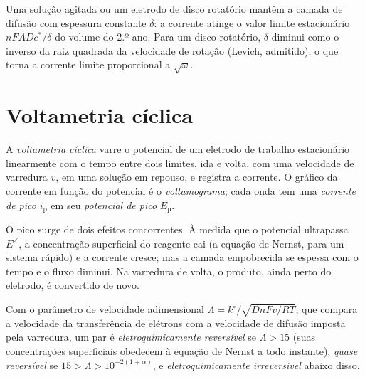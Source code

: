Uma solução agitada ou um eletrodo de disco rotatório mantêm a camada de difusão
com espessura constante $\delta$: a corrente atinge o valor limite estacionário $nFADc^*/\delta$
do volume do 2.º ano. Para um disco rotatório, $\delta$ diminui como o inverso da raiz
quadrada da velocidade de rotação (Levich, admitido), o que torna a corrente limite
proporcional a $\sqrt\omega$.

\section{Voltametria cíclica}

\begin{definition}\label{def:b3:electrode-kinetics:cv}
A \emph{voltametria cíclica} varre o potencial de um
eletrodo de trabalho estacionário linearmente com o tempo entre dois limites, ida
e volta, com uma velocidade de varredura $v$, em uma solução em repouso, e registra a
corrente. O gráfico da corrente em função do potencial é o \emph{voltamograma}; cada
onda tem uma \emph{corrente de pico} $i_{\mathrm p}$ em seu \emph{potencial de pico}
$E_{\mathrm p}$.
\end{definition}

O pico surge de dois efeitos concorrentes. À medida que o potencial ultrapassa $E^{\circ\prime}$,
a concentração superficial do reagente cai (a equação de Nernst, para um sistema
rápido) e a corrente cresce; mas a camada empobrecida se espessa com o tempo e o
fluxo diminui. Na varredura de volta, o produto, ainda perto do eletrodo, é
convertido de novo.

\begin{definition}[Reversibilidade]\label{def:b3:electrode-kinetics:reversibility}
Com o parâmetro de velocidade adimensional $\Lambda = k^\circ/\sqrt{DnFv/RT}$, que compara a
velocidade da transferência de elétrons com a velocidade de difusão imposta pela
varredura, um par é \emph{eletroquimicamente reversível}
se $\Lambda > 15$ (suas concentrações superficiais obedecem à equação de Nernst
a todo instante), \emph{quase reversível} se $15 >
\Lambda > 10^{-2(1 + \alpha)}$, e \emph{eletroquimicamente irreversível}
abaixo disso.
\end{definition}

